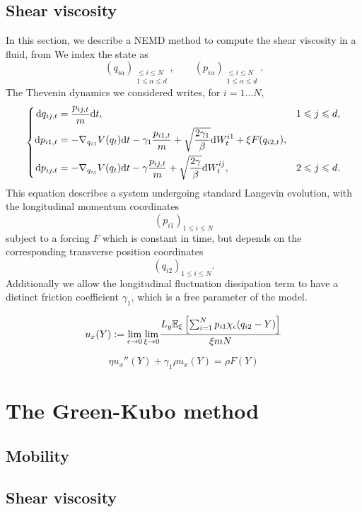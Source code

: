 \subsection{Shear viscosity}
In this section, we describe a NEMD method to compute the shear viscosity in a fluid, from \cite{JS12}
We index the state as \[\left(q_{i\alpha}\right)_{\substack{\leq i\leq N\\1\leq \alpha\leq d}},\qquad \left(p_{i\alpha}\right)_{\substack{\leq i\leq N\\1\leq \alpha\leq d}}.\]
The Thevenin dynamics we considered writes, for $i=1\dots N$,
\begin{equation}
    \label{eq:thevenin_sv_dynamics}
    \left\{\begin{aligned}
        \mathrm{d} q_{ij,t}&=\frac{p_{ij,t}}m\mathrm{d} t,&1\leqslant j\leqslant d,\\
        \mathrm{d} p_{i1,t}&=-\nabla_{q_{i1}}V(q_t)\mathrm{d} t-\gamma_1\frac{p_{i1,t}}m+\sqrt{\frac{2\gamma_1}\beta}\mathrm{d} W_t^{i1}+\xi F(q_{i2,t}),&\\
        \mathrm{d} p_{ij,t}&=-\nabla_{q_{ij}}V(q_t)\mathrm{d} t-\gamma \frac{p_{ij,t}}m+\sqrt{\frac{2\gamma}\beta}\mathrm{d} W_t^{ij},&2\leqslant j\leqslant d.
    \end{aligned}\right.
\end{equation}
This equation describes a system undergoing standard Langevin evolution, with the longitudinal momentum coordinates 
\[\left(p_{i1}\right)_{1\leq i\leq N}\]
subject to a forcing $F$ which is constant in time, but depends on the corresponding transverse position coordinates
\[\left(q_{i2}\right)_{1\leq i\leq N}.\]
Additionally we allow the longitudinal fluctuation dissipation term to have a distinct friction coefficient $\gamma_1$, which is a free parameter of the model.

\begin{equation}
    \label{eq:velocity_profile}
    u_x(Y)\mathrel{\mathop:}= \underset{\epsilon \to 0}{\lim} \, \underset{\xi \to 0}{\lim} \frac{L_y\mathbb{E}_\xi \left[\sum_{i=1}^N p_{i1}\chi_\epsilon(q_{i2}-Y)\right]}{\xi mN}
\end{equation}

\begin{equation}
    \label{eq:shear_viscosity_relation_diffeq}
    \eta u_x''(Y)+\gamma_1 \rho u_x(Y)=\rho F(Y)
\end{equation}

\section{The Green-Kubo method}
\subsection{Mobility}
\subsection{Shear viscosity}